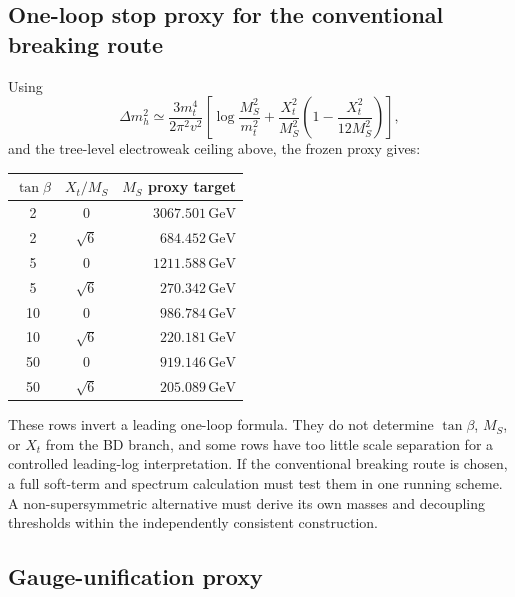 \documentclass[11pt]{article}
\theoremstyle{remark}
\theoremstyle{plain}
\begin{document}
\subsection{One-loop stop proxy for the conventional breaking route}

Using
\[
\Delta m_h^2
\simeq
\frac{3m_t^4}{2\pi^2v^2}
\left[
\log\frac{M_S^2}{m_t^2}
+
\frac{X_t^2}{M_S^2}
\left(
1-\frac{X_t^2}{12M_S^2}
\right)
\right],
\]
and the tree-level electroweak ceiling above, the frozen proxy gives:
\begin{longtable}{c c r}
\toprule
\(\tan\beta\) & \(X_t/M_S\) & \(M_S\) proxy target \\
\midrule
2 & \(0\) & \(3067.501\,\mathrm{GeV}\)\\
2 & \(\sqrt6\) & \(684.452\,\mathrm{GeV}\)\\
5 & \(0\) & \(1211.588\,\mathrm{GeV}\)\\
5 & \(\sqrt6\) & \(270.342\,\mathrm{GeV}\)\\
10 & \(0\) & \(986.784\,\mathrm{GeV}\)\\
10 & \(\sqrt6\) & \(220.181\,\mathrm{GeV}\)\\
50 & \(0\) & \(919.146\,\mathrm{GeV}\)\\
50 & \(\sqrt6\) & \(205.089\,\mathrm{GeV}\)\\
\bottomrule
\end{longtable}
These rows invert a leading one-loop formula. They do not determine \(\tan\beta\), \(M_S\), or
\(X_t\) from the BD branch, and some rows have too little scale separation for a controlled
leading-log interpretation. If the conventional breaking route is chosen, a full soft-term and
spectrum calculation must test them in one running scheme. A non-supersymmetric alternative must
derive its own masses and decoupling thresholds within the independently consistent construction.

\subsection{Gauge-unification proxy}
\end{document}
